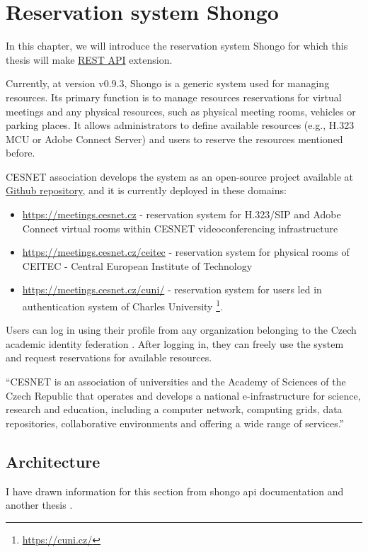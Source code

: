 \chapter{Reservation system Shongo}
In this chapter, we will introduce the reservation system Shongo for which this thesis will make \hyperref[rest]{REST API} extension.

Currently, at version v0.9.3, Shongo is a generic system used for managing resources.
Its primary function is to manage resources reservations for virtual meetings and any physical resources, such as physical meeting rooms, vehicles or parking places.
It allows administrators to define available resources (e.g., H.323 MCU or Adobe
Connect Server) and users to reserve the resources mentioned before. \cite{shongo}

CESNET association develops the system as an open-source project available at \href{https://github.com/shongo/shongo}{Github repository}, and it is currently deployed in these domains:
\begin{itemize}
    \item \url{https://meetings.cesnet.cz} - reservation system for H.323/SIP and Adobe Connect virtual rooms within CESNET videoconferencing infrastructure
    \item \url{https://meetings.cesnet.cz/ceitec} - reservation system for physical rooms of CEITEC - Central European Institute of Technology
    \item \url{https://meetings.cesnet.cz/cuni/} - reservation system for users led in authentication system of Charles University \footnote{\url{https://cuni.cz/}}.
\end{itemize}

Users can log in using their profile from any organization belonging to the Czech academic identity federation .
After logging in, they can freely use the system and request reservations for available resources.

\enquote{CESNET is an association of universities and the Academy of Sciences of the Czech Republic that operates and develops a national e-infrastructure for science, research and education, including a computer network, computing grids, data repositories, collaborative environments and offering a wide range of services.} \cite{cesnet}

\section{Architecture}
I have drawn information for this section from shongo api documentation  and another thesis .

